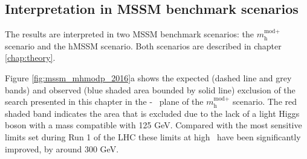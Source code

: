 \subsection{Interpretation in MSSM benchmark scenarios}
\label{sec:mssm_results_modeldep}
The results are interpreted in two MSSM benchmark scenarios: the $m_{\text{h}}^{\text{mod+}}$
scenario and the hMSSM scenario. Both scenarios are described in chapter \ref{chap:theory}.

Figure \ref{fig:mssm_mhmodp_2016}a shows the expected (dashed line and grey bands) and
observed (blue shaded area bounded by solid line) exclusion of the search presented in this chapter
in the \mA-\tanb~ plane of the $m_{\text{h}}^{\text{mod+}}$ scenario. The red shaded band
indicates the area that is excluded due to the lack of a light Higgs boson with a mass compatible
with 125 GeV. Compared with the most sensitive limits set during Run 1 of the \ac{LHC} these
limits at high \tanb~have been significantly improved, by around 300 GeV.

